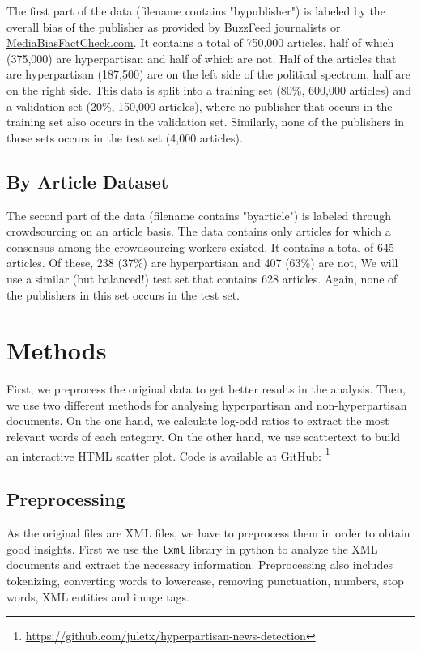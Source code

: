 \documentclass[11pt,a4paper]{article}
\begin{document}
The first part of the data (filename contains "bypublisher") is labeled by the overall bias of the publisher as provided by BuzzFeed journalists or \href{https://mediabiasfactcheck.com}{MediaBiasFactCheck.com}. It contains a total of 750,000 articles, half of which (375,000) are hyperpartisan and half of which are not. Half of the articles that are hyperpartisan (187,500) are on the left side of the political spectrum, half are on the right side. This data is split into a training set (80\%, 600,000 articles) and a validation set (20\%, 150,000 articles), where no publisher that occurs in the training set also occurs in the validation set. Similarly, none of the publishers in those sets occurs in the test set (4,000 articles).

\subsection{By Article Dataset}

The second part of the data (filename contains "byarticle") is labeled through crowdsourcing on an article basis. The data contains only articles for which a consensus among the crowdsourcing workers existed. It contains a total of 645 articles. Of these, 238 (37\%) are hyperpartisan and 407 (63\%) are not, We will use a similar (but balanced!) test set that contains 628 articles. Again, none of the publishers in this set occurs in the test set.

\section{Methods}

First, we preprocess the original data to get better results in the analysis. Then, we use two different methods for analysing hyperpartisan and non-hyperpartisan documents. On the one hand, we calculate log-odd ratios to extract the most relevant words of each category. On the other hand, we use scattertext \cite{kessler2017scattertext} to build an interactive HTML scatter plot. Code is available at GitHub: \footnote{\url{https://github.com/juletx/hyperpartisan-news-detection}}

\subsection{Preprocessing}

As the original files are XML files, we have to preprocess them in order to obtain good insights. First we use the \texttt{lxml} library in python to analyze the XML documents and extract the necessary information. Preprocessing also includes tokenizing, converting words to lowercase, removing punctuation, numbers, stop words, XML entities and image tags.
\end{document}
